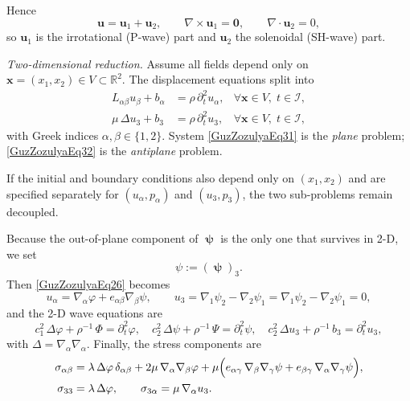 Hence
\begin{equation}\label{GuzZozulyaEq30}
	\mathbf{u} = \mathbf{u}_1 + \mathbf{u}_2,
	\qquad
	\nabla \times \mathbf{u}_1 = \mathbf{0},
	\qquad
	\nabla \cdot \mathbf{u}_2 = 0,
\end{equation}
so $\mathbf{u}_1$ is the irrotational (P-wave) part and $\mathbf{u}_2$ the
solenoidal (SH-wave) part.

\medskip
\emph{Two-dimensional reduction.} Assume all fields depend only on
$\mathbf{x}=(x_1,x_2)\in V\subset\mathbb{R}^{2}$.  The displacement equations
split into
\begin{align}
	L_{\alpha\beta}u_\beta + b_\alpha &= \rho\,\partial_t^{2}u_\alpha,
	&\forall\mathbf{x}\in V,\; t\in\mathcal{I},
	\label{GuzZozulyaEq31}\\
	\mu\,\Delta u_3 + b_3           &= \rho\,\partial_t^{2}u_3,
	&\forall\mathbf{x}\in V,\; t\in\mathcal{I},
	\label{GuzZozulyaEq32}
\end{align}
with Greek indices $\alpha,\beta\in\{1,2\}$.  System
\eqref{GuzZozulyaEq31} is the \emph{plane} problem; \eqref{GuzZozulyaEq32}
is the \emph{antiplane} problem.

If the initial and boundary conditions also depend only on $(x_1,x_2)$ and are
specified separately for $(u_\alpha,p_\alpha)$ and $(u_3,p_3)$, the two
sub-problems remain decoupled.

Because the out-of-plane component of $\bm{\uppsi}$ is the only one that
survives in 2-D, we set
\[
\psi := (\bm{\uppsi})_3.
\]
Then \eqref{GuzZozulyaEq26} becomes
\begin{equation}\label{GuzZozulyaEq33}
	u_\alpha = \nabla_\alpha \varphi + e_{\alpha\beta}\nabla_\beta \psi,
	\qquad
	u_3      = \nabla_1 \psi_2 - \nabla_2 \psi_1
	= \nabla_1 \psi_2 - \nabla_2 \psi_1
	= 0,
\end{equation}
and the 2-D wave equations are
\begin{equation}\label{GuzZozulyaEq34}
	c_1^{2}\,\Delta\varphi + \rho^{-1}\,\Phi = \partial_t^{2}\varphi,
	\quad
	c_2^{2}\,\Delta\psi    + \rho^{-1}\,\Psi = \partial_t^{2}\psi,
	\quad
	c_2^{2}\,\Delta u_3    + \rho^{-1}\,b_3  = \partial_t^{2}u_3,
\end{equation}
with $\Delta = \nabla_\alpha\nabla_\alpha$.  Finally, the stress components are
\begin{equation}\label{GuzZozulyaEq35}
	\begin{aligned}
		\sigma_{\alpha\beta} &=
		\lambda\,\Delta\varphi\,\delta_{\alpha\beta}
		+ 2\mu\,\nabla_\alpha\nabla_\beta\varphi
		+ \mu\Bigl(
		e_{\alpha\gamma}\,\nabla_\beta\nabla_\gamma\psi
		+ e_{\beta\gamma}\,\nabla_\alpha\nabla_\gamma\psi
		\Bigr),
		\\
		\sigma_{33} &= \lambda\,\Delta\varphi,
		\qquad
		\sigma_{3\alpha} = \mu\,\nabla_\alpha u_3.
	\end{aligned}
\end{equation}

